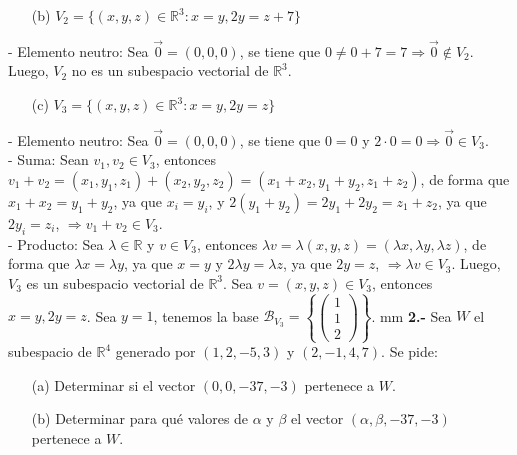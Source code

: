 \documentclass[11pt,a4paper]{article}
\newcommand{\R}{\mathbb R}
\begin{document}
\begin{itemize}\item[(b)]$V_2=\{(x,y,z)\in\R^3:x=y, 2y=z+7\}$\end{itemize}

- Elemento neutro: Sea $\vec 0 =(0,0,0)$, se tiene que $0\ne 0+7=7\Rightarrow \vec 0\not\in V_2$.
\vskip 0.5mm
Luego, $V_2$ no es un subespacio vectorial de $\R^3$.

\begin{itemize}\item[(c)]$V_3=\{(x,y,z)\in\R^3:x=y, 2y=z\}$\end{itemize}

- Elemento neutro: Sea $\vec 0=(0,0,0)$, se tiene que $0=0$ y $2\cdot 0=0\Rightarrow \vec 0\in V_3$.\\
- Suma: Sean $v_1,v_2\in V_3$, entonces $v_1+v_2=(x_1,y_1,z_1)+(x_2,y_2,z_2)=(x_1+x_2,y_1+y_2,z_1+z_2)$, de forma que $x_1+x_2=y_1+y_2$, ya que $x_i=y_i$, y $2(y_1+y_2)=2y_1+2y_2=z_1+z_2$, ya que $2y_i=z_i$, $\Rightarrow v_1+v_2\in V_3$.\\
- Producto: Sea $\lambda\in\R$ y $v\in V_3$, entonces $\lambda v=\lambda(x,y,z)=(\lambda x,\lambda y,\lambda z)$, de forma que $\lambda x=\lambda y$, ya que $x=y$ y $2\lambda y=\lambda z$, ya que $2y=z$, $\Rightarrow \lambda v\in V_3$.
\vskip 0.5mm
Luego, $V_3$ es un subespacio vectorial de $\R^3$.
\vskip 1mm
Sea $v=(x,y,z)\in V_3$, entonces $x=y, 2y=z$. Sea $y=1$, tenemos la base $\mathcal B_{V_3}=\left\{\begin{pmatrix}1\\1\\2\end{pmatrix}\right\}$.
 mm
{\bf 2.-} Sea $W$ el subespacio de $\R^4$ generado por $(1,2,-5,3)$ y $(2,-1,4,7)$. Se pide:
\begin{itemize}
\item[(a)] Determinar si el vector $(0,0,-37,-3)$ pertenece a $W$.
\item[(b)] Determinar para qué valores de $\alpha$ y $\beta$ el vector $(\alpha,\beta,-37,-3)$ pertenece a $W$.
\end{itemize}
\vskip 1mm
\end{document}
